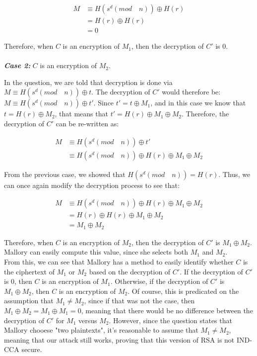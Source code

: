 \documentclass[11pt]{article}
\theoremstyle{definition}
\begin{document}
\begin{enumerate}
    \begin{align*}
        M &\equiv H(s^d (mod \quad n)) \oplus H(r) \\
        &= H(r) \oplus H(r) \\
        &= 0
    \end{align*}
    
    Therefore, when $C$ is an encryption of $M_1$, then the decryption of $C'$ is 0. \\ \\
    
    
    \textbf{\textit{Case 2:}} $C$ is an encryption of $M_2$.
    
    In the question, we are told that decryption is done via $M \equiv H(s^d (mod \quad n)) \oplus t$. The decryption of $C'$ would therefore be: $M \equiv H(s^d (mod \quad n)) \oplus t'$. Since $t' = t \oplus M_1$, and in this case we know that $t = H(r) \oplus M_2$, that means that $t' = H(r) \oplus M_1 \oplus M_2$. Therefore, the decryption of $C'$ can be re-written as: 
    
    \begin{align*}
        M &\equiv H(s^d (mod \quad n)) \oplus t' \\
        &\equiv H(s^d (mod \quad n)) \oplus H(r) \oplus M_1 \oplus M_2
    \end{align*}
    
    From the previous case, we showed that $H(s^d (mod \quad n)) = H(r)$. Thus, we can once again modify the decryption process to see that:
    
    \begin{align*}
        M &\equiv H(s^d (mod \quad n)) \oplus H(r) \oplus M_1 \oplus M_2 \\
        &= H(r) \oplus H(r) \oplus M_1 \oplus M_2 \\
        &= M_1 \oplus M_2
    \end{align*}
    
    Therefore, when $C$ is an encryption of $M_2$, then the decryption of $C'$ is $M_1 \oplus M_2$. Mallory can easily compute this value, since she selects both $M_1$ and $M_2$. \\
    
    From this, we can see that Mallory has a method to easily identify whether $C$ is the ciphertext of $M_1$ or $M_2$ based on the decryption of $C'$. If the decryption of $C'$ is 0, then $C$ is an encryption of $M_1$. Otherwise, if the decryption of $C'$ is $M_1 \oplus M_2$, then $C$ is an encryption of $M_2$. Of course, this is predicated on the assumption that $M_1 \neq M_2$, since if that was not the case, then $M_1 \oplus M_2 = M_1 \oplus M_1 = 0$, meaning that there would be no difference between the decryption of $C'$ for $M_1$ versus $M_2$. However, since the question states that Mallory chooese "two plaintexts", it's reasonable to assume that $M_1 \neq M_2$, meaning that our attack still works, proving that this version of RSA is not IND-CCA secure.
    


\end{enumerate}
\end{document}
